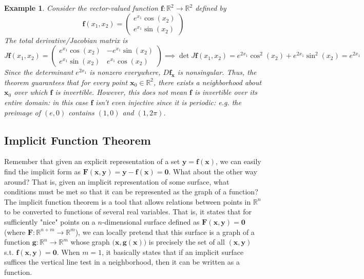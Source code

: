 \documentclass{article}
\newtheorem{example}{Example}[section]
\theoremstyle{remark}
\theoremstyle{definition}
\begin{document}
\begin{example}
Consider the vector-valued function $\mathbf{f}: \mathbb{R}^2 \longrightarrow \mathbb{R}^2$ defined by 
\[\mathbf{f}(x_1, x_2) = \begin{pmatrix}
e^{x_1}\cos (x_2) \\ e^{x_1} \sin(x_2)
\end{pmatrix}\]
The total derivative/Jacobian matrix is 
\[J \mathbf{f}(x_1, x_2) = \begin{pmatrix}
e^{x_1} \cos(x_2) & - e^{x_1} \sin(x_2) \\
e^{x_1} \sin(x_2) & e^{x_1} \cos(x_2)
\end{pmatrix} \implies \det J \mathbf{f}(x_1, x_2) = e^{2x_1} \cos^2 (x_2) + e^{2x_1} \sin^2 (x_2) = e^{2x_1}\]
Since the determinant $e^{2x_1}$ is nonzero everywhere, $D \mathbf{f}_\mathbf{x}$ is nonsingular. Thus, the theorem guarantees that for every point $\mathbf{x}_0 \in \mathbb{R}^2$, there exists a neighborhood about $\mathbf{x}_0$ over which $\mathbf{f}$ is invertible. However, this does not mean $\mathbf{f}$ is invertible over its entire domain: in this case $\mathbf{f}$ isn't even injective since it is periodic: e.g. the preimage of $(e, 0)$ contains $(1, 0)$ and $(1, 2\pi)$. 
\end{example}

\subsection{Implicit Function Theorem}
Remember that given an explicit representation of a set $\mathbf{y} = \mathbf{f}(\mathbf{x})$, we can easily find the implicit form as $\mathbf{F}(\mathbf{x}, \mathbf{y}) = \mathbf{y} - \mathbf{f}(\mathbf{x}) = \mathbf{0}$. What about the other way around? That is, given an implicit representation of some surface, what conditions must be met so that it can be represented as the graph of a function? The implicit function theorem is a tool that allows relations between points in $\mathbb{R}^n$ to be converted to functions of several real variables. That is, it states that for sufficiently "nice" points on a $n$-dimensional surface defined as $\mathbf{F}(\mathbf{x}, \mathbf{y}) = \mathbf{0}$ (where $\mathbf{F}: \mathbb{R}^{n+m} \longrightarrow \mathbb{R}^m$), we can locally pretend that this surface is a graph of a function $\mathbf{g}: \mathbb{R}^n \longrightarrow \mathbb{R}^m$ whose graph $\big(\mathbf{x}, \mathbf{g}(\mathbf{x})\big)$ is precisely the set of all $(\mathbf{x}, \mathbf{y})$ s.t. $\mathbf{f}(\mathbf{x}, \mathbf{y}) = \mathbf{0}$. When $m = 1$, it basically states that if an implicit surface suffices the vertical line test in a neighborhood, then it can be written as a function. 
\end{document}
